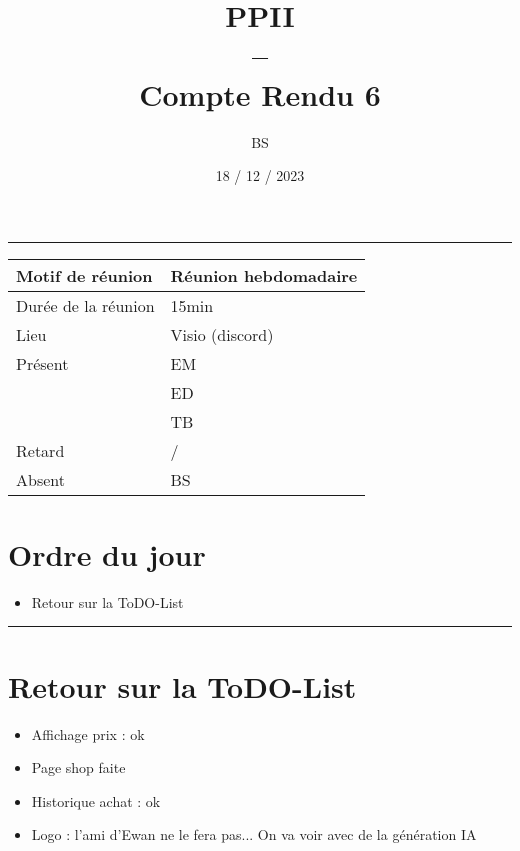 \documentclass[10pt,a4paper]{report}
\title{PPII \\ -- \\ Compte Rendu 6}
\date{18 / 12 / 2023}
\author{BS}
\begin{document}
\maketitle

\tableofcontents \bigskip

\noindent\rule{\linewidth}{0.5mm} \bigskip

                \begin{tabular}{|l | l|}
                        \hline
                Motif de réunion & Réunion hebdomadaire \\
                        \hline
                Durée de la réunion & 15min \\
                        \hline
                Lieu & Visio (discord) \\
                        \hline
                Présent & EM \\
                        & ED \\
                        & TB  \\
                        \hline
                Retard  & / \\
                        \hline
                Absent  & BS \\
                        \hline
                \end{tabular}


\section{Ordre du jour}
\begin{itemize}
        \item Retour sur la ToDO-List
\end{itemize}

\noindent\rule{\linewidth}{0.5mm} \bigskip
\section{Retour sur la ToDO-List}
\begin{itemize}
        \item Affichage prix : ok
        \item Page shop faite
        \\
        \item Historique achat : ok
        \\
        \item Logo : l'ami d'Ewan ne le fera pas... On va voir avec de la génération IA 
\end{itemize}
\end{document}
